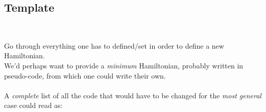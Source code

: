 


\subsection{Template}

\\
	

  Go through everything one has to defined/set in order to define a new Hamiltonian. \\

We'd perhaps want to provide a \emph{minimum} Hamiltonian, probably written in pseudo-code, from which one could write their own.\\ \\

\noindent A \emph{complete} list of all the code that would have to be changed for the \emph{most general} case could read as:

